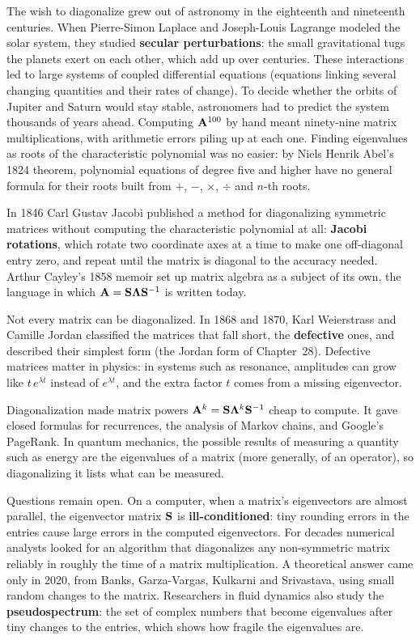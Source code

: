 \begin{historybox}
The wish to diagonalize grew out of astronomy in the eighteenth and nineteenth
centuries. When Pierre-Simon Laplace and Joseph-Louis Lagrange modeled the solar
system, they studied \textbf{secular perturbations}: the small gravitational
tugs the planets exert on each other, which add up over centuries. These
interactions led to large systems of coupled differential equations (equations
linking several changing quantities and their rates of change). To decide
whether the orbits of Jupiter and Saturn would stay stable, astronomers had to
predict the system thousands of years ahead. Computing $\mathbf{A}^{100}$ by hand
meant ninety-nine matrix multiplications, with arithmetic errors piling up at
each one. Finding eigenvalues as roots of the characteristic polynomial was no
easier: by Niels Henrik Abel's 1824 theorem, polynomial equations of degree five
and higher have no general formula for their roots built from $+$, $-$,
$\times$, $\div$ and $n$-th roots.

In 1846 Carl Gustav Jacobi published a method for diagonalizing symmetric
matrices without computing the characteristic polynomial at all:
\textbf{Jacobi rotations}, which rotate two coordinate axes at a time to make
one off-diagonal entry zero, and repeat until the matrix is diagonal to the
accuracy needed. Arthur Cayley's 1858 memoir set up matrix algebra as a subject
of its own, the language in which $\mathbf{A} = \mathbf{S}\mathbf{\Lambda}\mathbf{S}^{-1}$ is
written today.

Not every matrix can be diagonalized. In 1868 and 1870, Karl Weierstrass and
Camille Jordan classified the matrices that fall short, the
\textbf{defective} ones, and described their simplest form (the Jordan form of
Chapter~28). Defective matrices matter in physics: in systems such as
resonance, amplitudes can grow like $t\,e^{\lambda t}$ instead of $e^{\lambda t}$,
and the extra factor $t$ comes from a missing eigenvector.

Diagonalization made matrix powers $\mathbf{A}^k = \mathbf{S}\mathbf{\Lambda}^k\mathbf{S}^{-1}$
cheap to compute. It gave closed formulas for recurrences, the analysis of
Markov chains, and Google's PageRank. In quantum mechanics, the possible results
of measuring a quantity such as energy are the eigenvalues of a matrix (more
generally, of an operator), so diagonalizing it lists what can be measured.

Questions remain open. On a computer, when a matrix's eigenvectors are almost
parallel, the eigenvector matrix $\mathbf{S}$ is \textbf{ill-conditioned}: tiny
rounding errors in the entries cause large errors in the computed eigenvectors.
For decades numerical analysts looked for an algorithm that diagonalizes any
non-symmetric matrix reliably in roughly the time of a matrix multiplication.
A theoretical answer came only in 2020, from Banks, Garza-Vargas, Kulkarni and
Srivastava, using small random changes to the matrix. Researchers in fluid
dynamics also study the \textbf{pseudospectrum}: the set of complex numbers that
become eigenvalues after tiny changes to the entries, which shows how fragile
the eigenvalues are.
\end{historybox}

